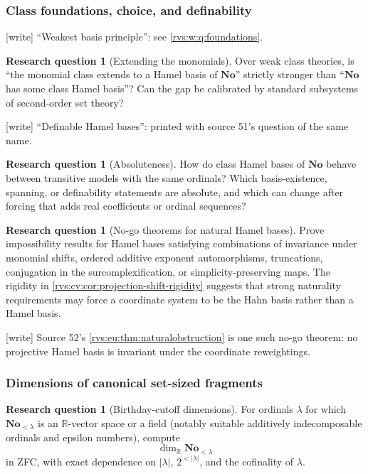 \documentclass[11pt,letterpaper]{article}
\numberwithin{equation}{section}
\theoremstyle{definition}
\newtheorem{question}[theorem]{Research question}
\theoremstyle{remark}
\newcommand{\No}{\mathbf{No}}
\newcommand{\R}{\mathbb{R}}
\newcommand{\wtag}{\textup{[write]}}%
\begin{document}
\subsubsection{Class foundations, choice, and definability}

\noindent\wtag{} ``Weakest basis principle'': see \cref{rvs:w:q:foundations}.

\begin{question}[Extending the monomials]
Over weak class theories, is ``the monomial class extends to a Hamel basis of
$\No$'' strictly stronger than ``$\No$ has some class Hamel basis''? Can the gap
be calibrated by standard subsystems of second-order set theory?
\end{question}

\noindent\wtag{} ``Definable Hamel bases'': printed with source 51's
question of the same name.

\begin{question}[Absoluteness]
How do class Hamel bases of $\No$ behave between transitive models with the same
ordinals? Which basis-existence, spanning, or definability statements are absolute,
and which can change after forcing that adds real coefficients or ordinal sequences?
\end{question}

\begin{question}[No-go theorems for natural Hamel bases]
Prove impossibility results for Hamel bases satisfying combinations of invariance
under monomial shifts, ordered additive exponent automorphisms, truncations,
conjugation in the surcomplexification, or simplicity-preserving maps. The
rigidity in \cref{rvs:cv:cor:projection-shift-rigidity} suggests that strong naturality
requirements may force a coordinate system to be the Hahn basis rather than a
Hamel basis.
\end{question}

\noindent\wtag{} Source 52's \cref{rvs:eu:thm:naturalobstruction} is one
such no-go theorem: no projective Hamel basis is invariant under the
coordinate reweightings.

\subsubsection{Dimensions of canonical set-sized fragments}

\begin{question}[Birthday-cutoff dimensions]
For ordinals $\lambda$ for which $\No_{<\lambda}$ is an $\R$-vector space or a
field (notably suitable additively indecomposable ordinals and epsilon numbers),
compute
\[
  \dim_{\R}\No_{<\lambda}
\]
in ZFC, with exact dependence on $|\lambda|$, $2^{<|\lambda|}$, and the cofinality
of $\lambda$.
\end{question}
\end{document}
